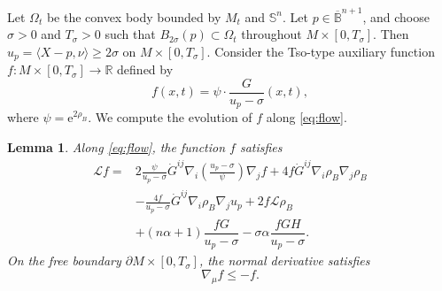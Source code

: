 \documentclass[11pt, reqno]{amsart}
\newtheorem{lemma}[theorem]{Lemma}
\theoremstyle{remark}
\theoremstyle{definition}
\numberwithin{equation}{section}
\begin{document}
Let $\Omega_t$ be the convex body bounded by $M_t$ and $\mathbb{S}^n$. Let $p\in\overline{\mathbb{B}}^{n+1}$, and choose $\sigma>0$ and $T_{\sigma}>0$ such that $B_{2\sigma}(p)\subset\Omega_t$ throughout $M\times [0,T_{\sigma}]$. Then $u_p=\langle X-p,\nu \rangle\geq 2\sigma$ on $M\times [0,T_{\sigma}]$.  Consider the Tso-type \cite{Tso1985} auxiliary function $f: M\times [0,T_{\sigma}]\to\mathbb{R}$ defined by
\begin{equation*}
f(x,t) = \psi \cdot \dfrac{G}{u_p-\sigma}(x,t),
\end{equation*}
where $\psi=\mathrm{e}^{2\rho_B}$.  We compute the evolution of $f$ along \eqref{eq:flow}.

\begin{lemma}\label{lem:Tso-quotient-alpha}
Along \eqref{eq:flow}, the function $f$ satisfies
\begin{align}
\mathcal{L} f=&2\frac{\psi}{u_p-\sigma}\dot G^{ij}
        \nabla_i\!\left(\frac{u_p-\sigma}{\psi}\right)\nabla_jf
        +4f\dot G^{ij}\nabla_i\rho_B\nabla_j\rho_B\nonumber\\
        &-\frac{4f}{u_p-\sigma}\dot G^{ij}\nabla_i\rho_B\nabla_j u_p + 2f\mathcal{L}\rho_B\nonumber\\
        & + (n\alpha+1)\dfrac{fG}{u_p-\sigma} - \sigma\alpha\dfrac{fGH}{u_p-\sigma}.
        \label{eq:Lf-drift-alpha}
\end{align}
On the free boundary $\partial M\times[0,T_{\sigma}]$, the normal derivative satisfies
\begin{equation}
\label{eq:Tso-boundary-derivative}
\nabla_{\mu}f\leq -f.
\end{equation}
\end{lemma}
\end{document}
